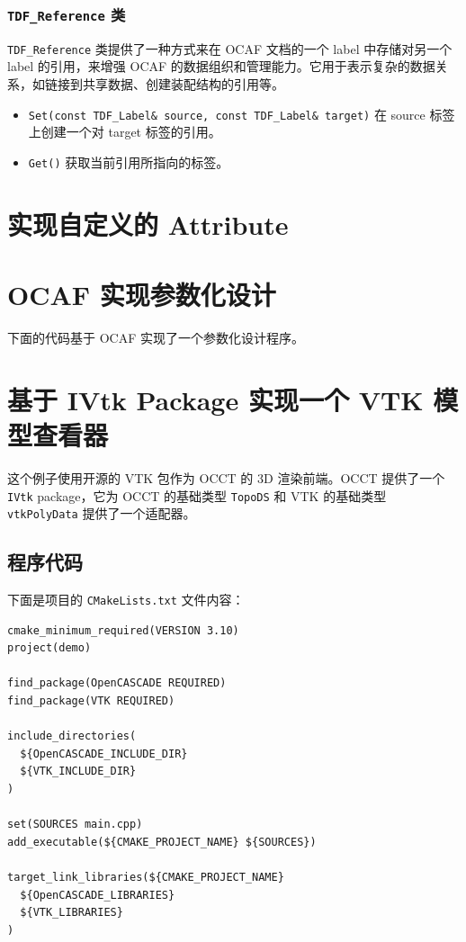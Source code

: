 \documentclass[11pt]{article}
\let\oldsection\section
\renewcommand{\section}{\clearpage\oldsection}
\begin{document}
\subsubsection{\texttt{TDF\_Reference} 类}
\label{sec:org1cfae96}

\texttt{TDF\_Reference} 类提供了一种方式来在 OCAF 文档的一个 label 中存储对另一个 label 的引用，来增强 OCAF 的数据组织和管理能力。它用于表示复杂的数据关系，如链接到共享数据、创建装配结构的引用等。

\begin{itemize}
\item \texttt{Set(const TDF\_Label\& source, const TDF\_Label\& target)} 在 source 标签上创建一个对 target 标签的引用。
\item \texttt{Get()} 获取当前引用所指向的标签。
\end{itemize}
\section{实现自定义的 Attribute}
\label{sec:org4f3a8b2}




\section{OCAF 实现参数化设计}
\label{sec:org7ac6a4a}

下面的代码基于 OCAF 实现了一个参数化设计程序。
\section{基于 IVtk Package 实现一个 VTK 模型查看器}
\label{sec:orga2f4a0c}

这个例子使用开源的 VTK 包作为 OCCT 的 3D 渲染前端。OCCT 提供了一个 \texttt{IVtk} package，它为 OCCT 的基础类型 \texttt{TopoDS} 和 VTK 的基础类型 \texttt{vtkPolyData} 提供了一个适配器。
\subsection{程序代码}
\label{sec:org56c35c9}

下面是项目的 \texttt{CMakeLists.txt} 文件内容：

\begin{verbatim}
cmake_minimum_required(VERSION 3.10)
project(demo)

find_package(OpenCASCADE REQUIRED)
find_package(VTK REQUIRED)

include_directories(
  ${OpenCASCADE_INCLUDE_DIR}
  ${VTK_INCLUDE_DIR}
)

set(SOURCES main.cpp)
add_executable(${CMAKE_PROJECT_NAME} ${SOURCES})

target_link_libraries(${CMAKE_PROJECT_NAME}
  ${OpenCASCADE_LIBRARIES}
  ${VTK_LIBRARIES}
)
\end{verbatim}
\end{document}
